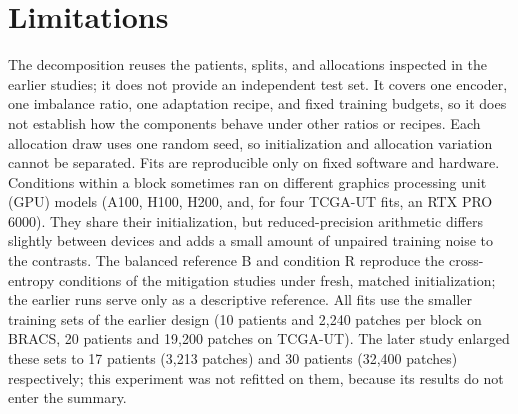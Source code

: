 \documentclass[11pt]{article}
\begin{document}
\section{Limitations}
\label{sec:limitations}
The decomposition reuses the patients, splits, and allocations inspected in the earlier studies; it does not provide an independent test set. It covers one encoder, one imbalance ratio, one adaptation recipe, and fixed training budgets, so it does not establish how the components behave under other ratios or recipes. Each allocation draw uses one random seed, so initialization and allocation variation cannot be separated. Fits are reproducible only on fixed software and hardware. Conditions within a block sometimes ran on different graphics processing unit (GPU) models (A100, H100, H200, and, for four TCGA-UT fits, an RTX PRO 6000). They share their initialization, but reduced-precision arithmetic differs slightly between devices and adds a small amount of unpaired training noise to the contrasts. The balanced reference B and condition R reproduce the cross-entropy conditions of the mitigation studies under fresh, matched initialization; the earlier runs serve only as a descriptive reference. All fits use the smaller training sets of the earlier design (10 patients and 2,240 patches per block on BRACS, 20 patients and 19,200 patches on TCGA-UT). The later study enlarged these sets to 17 patients (3,213 patches) and 30 patients (32,400 patches) respectively; this experiment was not refitted on them, because its results do not enter the summary.



\end{document}
